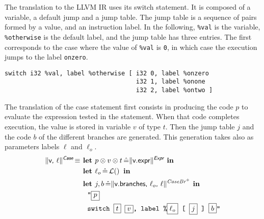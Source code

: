 \documentclass{article}
\newcommand{\trad}[2]{\ensuremath{\lVert \textsf{#1} \rVert^{\textit{#2}}}}
\DeclareMathOperator{\isdef}{\equiv}
\DeclareMathOperator{\lbl}{\mathcal{L}()}
\newcommand{\llvm}[1]{\texttt{#1}}
\newcommand{\B}[1]{\textsf{#1}}
\newcommand{\ListOf}[1]{$\mbox{#1}^+$}
\newcommand{\LET}[0]{\textbf{ let }}
\DeclareMathOperator{\BE}{\hat{=}}
\newcommand{\IN}[0]{\textbf{ in }}
\newcommand{\PH}[1]{\framebox{$#1$}}
\newcommand{\sep}[0]{\otimes}
\begin{document}
The translation to the LLVM IR uses its switch statement. It is composed of a
variable, a default jump and a jump table. The jump table is a sequence of pairs
formed by a value, and an instruction label. In the following, \llvm{\%val} is
the variable, \llvm{\%otherwise} is the default label, and the jump table has
three entries. The first corresponds to the case where the value of \llvm{\%val}
is \llvm{0}, in which case the execution jumps to the label \llvm{onzero}.
\begin{verbatim}
switch i32 %val, label %otherwise [ i32 0, label %onzero
                                    i32 1, label %onone
                                    i32 2, label %ontwo ]
\end{verbatim}

The translation of the case statement first consists in producing the code $p$
to evaluate the expression tested in the statement. When that code completes
execution, the value is stored in variable $v$ of type $t$. Then the jump table
$j$ and the code $b$ of the different branches are generated. This generation
takes also as parameters labels $\ell$ and $\ell_o$.
\begin{align*}
  \trad{v, $\ell$}{\B{Case}} \isdef & \LET p \sep v \sep t \BE \trad{v.expr}{\B{Expr}} \IN \\
  & \LET \ell_o \BE \lbl \IN \\
  & \LET j, b \BE \trad{v.branches, $\ell_o$, $\ell$}{\ListOf{CaseBr}} \IN \\
  & \quad \llvm{"\PH{p}} \\
  & \quad \llvm{switch \PH{t} \PH{v}, label \%\PH{\ell_o} [ \PH{j} ] \PH{b}"}
\end{align*}
\end{document}
